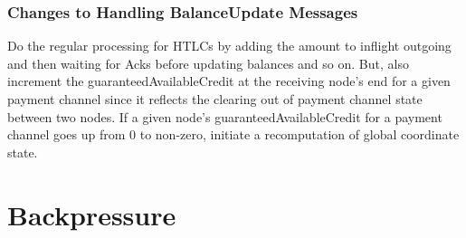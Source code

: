 \documentclass[a4paper]{article}
\begin{document}
\subsubsection{Changes to Handling BalanceUpdate Messages}
Do the regular processing for HTLCs by adding the amount to inflight outgoing and then waiting for Acks before
updating balances and so on. But, also increment the guaranteedAvailableCredit at the receiving node's end 
for a given payment channel since it reflects the clearing out of payment channel state between 
two nodes. If a given node's guaranteedAvailableCredit for a payment channel goes up from $0$ to non-zero,
initiate a recomputation of global coordinate state.




\section{Backpressure}
\end{document}
